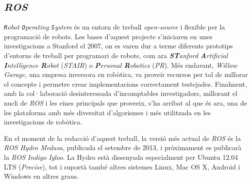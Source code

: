 \documentclass[12pt,a4paper,final,twoside]{report}
\begin{document}



  


\subsection{\textit{ROS}}
\label{ROS}

\textit{\texttt{R}obot \texttt{O}perating \texttt{S}ystem} \cite{ROS} és un entorn de treball \textit{open-source} i flexible per la programació de robots. Les bases d'aquest projecte s'iniciaren en unes investigacions a Stanford el 2007, on es varen dur a terme diferents prototips d'entorns de treball per programari de robots, com ara \textit{\textbf{ST}anford \textbf{A}rtificial \textbf{I}ntelligence \textbf{R}obot} (\textit{STAIR}) o \textit{\textbf{P}ersonal \textbf{R}obotics} (\textit{PR}). Més endavant, \textit{Willow Garage}, una empresa inversora en robòtica, va proveir recursos per tal de millorar el concepte i permetre crear implementacions correctament testejades. Finalment, amb la col·laboració desinteressada d'incomptables investigadors, millorant el nucli de \textit{ROS} i les eines principals que proveeix, s'ha arribat al que és ara, una de les plataforma amb més diversitat d'algorismes i més utilitzada en les investigacions de robòtica.

En el moment de la redacció d'aquest treball, la versió més actual de \textit{ROS} és la \textit{ROS Hydro Medusa}, publicada el setembre de 2013, i pròximament es publicarà la \textit{ROS Indigo Igloo}. La Hydro està dissenyada especialment per Ubuntu 12.04 LTS (\textit{Precise}), tot i suportà també altres sistemes Linux, Mac OS X, Android i Windows en altres graus.
\end{document}
